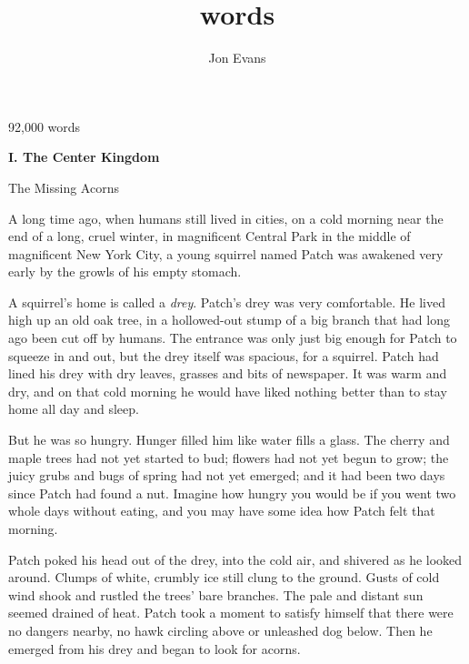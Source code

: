 \documentclass[11pt]{article}
\title{words}
\author{Jon Evans}
\begin{document}
\maketitle
\normalsize{92,000 words\par
}\par
\par
\par
{\it {\bf {}}}
\par
\par
{\bf I. The Center Kingdom
\par
\par
The Missing Acorns\par
}\par
 A long time ago, when humans still lived in cities, on a cold morning near the end of a long, cruel winter, in magnificent Central Park in the middle of magnificent New York City, a young squirrel named Patch was awakened very early by the growls of his empty stomach.\par
 A squirrel's home is called a {\it drey}. Patch's drey was very comfortable. He lived high up an old oak tree, in a hollowed-out stump of a big branch that had long ago been cut off by humans. The entrance was only just big enough for Patch to squeeze in and out, but the drey itself was spacious, for a squirrel. Patch had lined his drey with dry leaves, grasses and bits of newspaper. It was warm and dry, and on that cold morning he would have liked nothing better than to stay home all day and sleep.\par
But he was so hungry. Hunger filled him like water fills a glass. The cherry and maple trees had not yet started to bud; flowers had not yet begun to grow; the juicy grubs and bugs of spring had not yet emerged; and it had been two days since Patch had found a nut. Imagine how hungry you would be if you went two whole days without eating, and you may have some idea how Patch felt that morning.\par
 Patch poked his head out of the drey, into the cold air, and shivered as he looked around. Clumps of white, crumbly ice still clung to the ground. Gusts of cold wind shook and rustled the trees' bare branches. The pale and distant sun seemed drained of heat. Patch took a moment to satisfy himself that there were no dangers nearby, no hawk circling above or unleashed dog below. Then he emerged from his drey and began to look for acorns.\par
\end{document}
